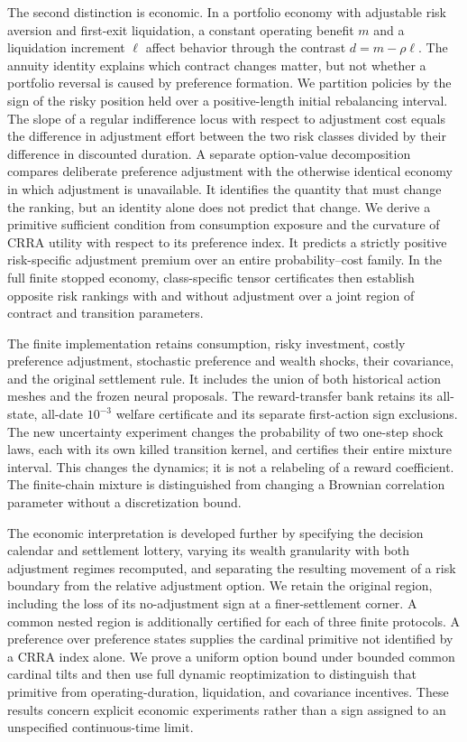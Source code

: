 The second distinction is economic. In a portfolio economy with adjustable risk aversion and first-exit liquidation, a constant operating benefit $m$ and a liquidation increment $\ell$ affect behavior through the contrast $d=m-\rho\ell$. The annuity identity explains which contract changes matter, but not whether a portfolio reversal is caused by preference formation. We partition policies by the sign of the risky position held over a positive-length initial rebalancing interval. The slope of a regular indifference locus with respect to adjustment cost equals the difference in adjustment effort between the two risk classes divided by their difference in discounted duration. A separate option-value decomposition compares deliberate preference adjustment with the otherwise identical economy in which adjustment is unavailable. It identifies the quantity that must change the ranking, but an identity alone does not predict that change. We derive a primitive sufficient condition from consumption exposure and the curvature of CRRA utility with respect to its preference index. It predicts a strictly positive risk-specific adjustment premium over an entire probability--cost family. In the full finite stopped economy, class-specific tensor certificates then establish opposite risk rankings with and without adjustment over a joint region of contract and transition parameters.

The finite implementation retains consumption, risky investment, costly preference adjustment, stochastic preference and wealth shocks, their covariance, and the original settlement rule. It includes the union of both historical action meshes and the frozen neural proposals. The reward-transfer bank retains its all-state, all-date $10^{-3}$ welfare certificate and its separate first-action sign exclusions. The new uncertainty experiment changes the probability of two one-step shock laws, each with its own killed transition kernel, and certifies their entire mixture interval. This changes the dynamics; it is not a relabeling of a reward coefficient. The finite-chain mixture is distinguished from changing a Brownian correlation parameter without a discretization bound.

The economic interpretation is developed further by specifying the decision calendar and settlement lottery, varying its wealth granularity with both adjustment regimes recomputed, and separating the resulting movement of a risk boundary from the relative adjustment option. We retain the original region, including the loss of its no-adjustment sign at a finer-settlement corner. A common nested region is additionally certified for each of three finite protocols. A preference over preference states supplies the cardinal primitive not identified by a CRRA index alone. We prove a uniform option bound under bounded common cardinal tilts and then use full dynamic reoptimization to distinguish that primitive from operating-duration, liquidation, and covariance incentives. These results concern explicit economic experiments rather than a sign assigned to an unspecified continuous-time limit.

